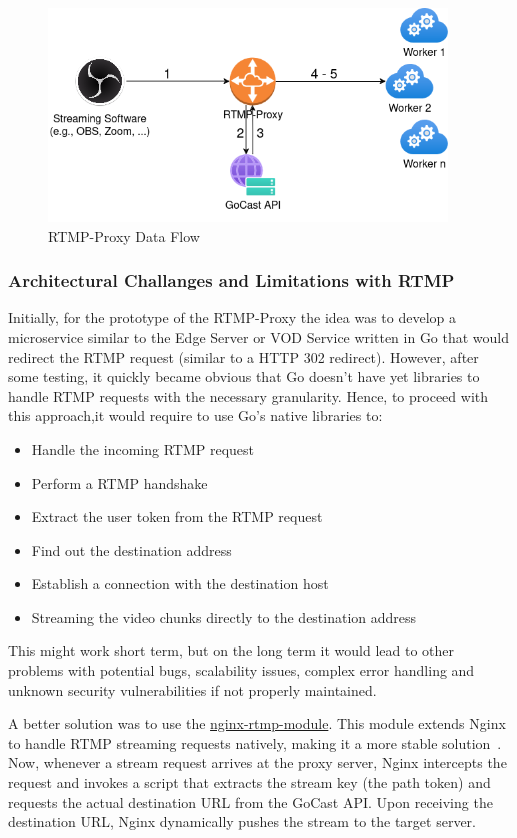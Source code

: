 \begin{figure}[htpb]
    \centering
    \includegraphics[width=300pt]{images/RtmpProxy.png}
    \caption[RTMP-Proxy Flow]{RTMP-Proxy Data Flow}\label{fig:rtmp-proxy}
\end{figure}

\subsubsection{Architectural Challanges and Limitations with RTMP}

Initially, for the prototype of the RTMP-Proxy the idea was to develop a microservice similar to the Edge Server or VOD Service written in Go that would redirect the RTMP request (similar to a HTTP 302 redirect). However, after some testing, it quickly became obvious that Go doesn't have yet libraries to handle RTMP requests with the necessary granularity. Hence, to proceed with this approach,it would require to use Go's native libraries to: 
\begin{itemize}
\item Handle the incoming \ac{RTMP} request
\item Perform a RTMP handshake
\item Extract the user token from the RTMP request
\item Find out the destination address
\item Establish a connection with the destination host
\item Streaming the video chunks directly to the destination address
\end{itemize}

This might work short term, but on the long term it would lead to other problems with potential bugs, scalability issues, complex error handling and unknown security vulnerabilities if not properly maintained.

A better solution was to use the \href{https://github.com/arut/nginx-rtmp-module}{nginx-rtmp-module}. This module extends Nginx to handle \ac{RTMP} streaming requests natively, making it a more stable solution~\parencite{nginx_rtmp_module}. 
Now, whenever a stream request arrives at the proxy server, Nginx intercepts the request and invokes a script that extracts the stream key (the path token) and requests the actual destination URL from the GoCast \ac{API}. Upon receiving the destination URL, Nginx dynamically pushes the stream to the target server.

